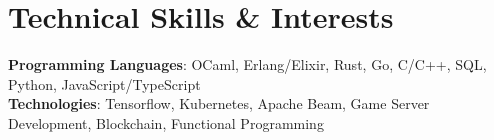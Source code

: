 \documentclass[letterpaper,11pt]{article}
\begin{document}
%
\section{Technical Skills \& Interests}
\begin{itemize}[leftmargin=0.15in, label={}]
  \small{\item{ \textbf{Programming Languages}{: OCaml, Erlang/Elixir, Rust, Go,
                  C/C++, SQL, Python, JavaScript/TypeScript} \\
                \textbf{Technologies}{: Tensorflow, Kubernetes, Apache Beam,
                  Game Server Development, Blockchain, Functional Programming}
          }}
\end{itemize}
\end{document}
